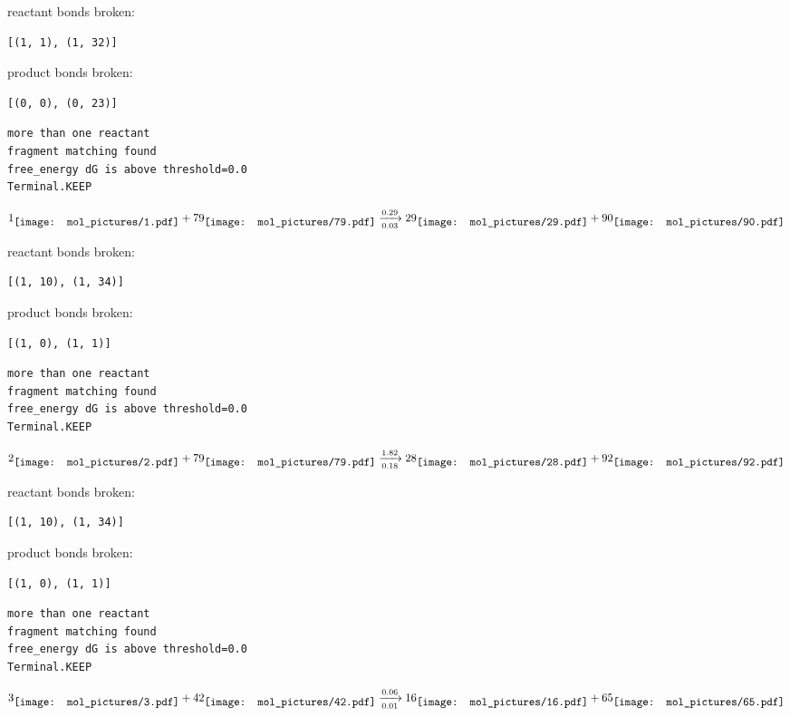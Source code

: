 \documentclass{article}
\begin{document}
reactant bonds broken:\begin{verbatim}
[(1, 1), (1, 32)]
\end{verbatim}
product bonds broken:\begin{verbatim}
[(0, 0), (0, 23)]
\end{verbatim}




\vspace{1cm}
\begin{verbatim}
more than one reactant
fragment matching found
free_energy dG is above threshold=0.0
Terminal.KEEP
\end{verbatim}
$$
1
\raisebox{-.5\height}{\texttt{[image: mol\_pictures/1.pdf]}}
+
79
\raisebox{-.5\height}{\texttt{[image: mol\_pictures/79.pdf]}}
\xrightarrow[0.03]{0.29}
29
\raisebox{-.5\height}{\texttt{[image: mol\_pictures/29.pdf]}}
+
90
\raisebox{-.5\height}{\texttt{[image: mol\_pictures/90.pdf]}}
$$


reactant bonds broken:\begin{verbatim}
[(1, 10), (1, 34)]
\end{verbatim}
product bonds broken:\begin{verbatim}
[(1, 0), (1, 1)]
\end{verbatim}




\vspace{1cm}
\begin{verbatim}
more than one reactant
fragment matching found
free_energy dG is above threshold=0.0
Terminal.KEEP
\end{verbatim}
$$
2
\raisebox{-.5\height}{\texttt{[image: mol\_pictures/2.pdf]}}
+
79
\raisebox{-.5\height}{\texttt{[image: mol\_pictures/79.pdf]}}
\xrightarrow[0.18]{1.82}
28
\raisebox{-.5\height}{\texttt{[image: mol\_pictures/28.pdf]}}
+
92
\raisebox{-.5\height}{\texttt{[image: mol\_pictures/92.pdf]}}
$$


reactant bonds broken:\begin{verbatim}
[(1, 10), (1, 34)]
\end{verbatim}
product bonds broken:\begin{verbatim}
[(1, 0), (1, 1)]
\end{verbatim}




\vspace{1cm}
\begin{verbatim}
more than one reactant
fragment matching found
free_energy dG is above threshold=0.0
Terminal.KEEP
\end{verbatim}
$$
3
\raisebox{-.5\height}{\texttt{[image: mol\_pictures/3.pdf]}}
+
42
\raisebox{-.5\height}{\texttt{[image: mol\_pictures/42.pdf]}}
\xrightarrow[0.01]{0.06}
16
\raisebox{-.5\height}{\texttt{[image: mol\_pictures/16.pdf]}}
+
65
\raisebox{-.5\height}{\texttt{[image: mol\_pictures/65.pdf]}}
$$
\end{document}
